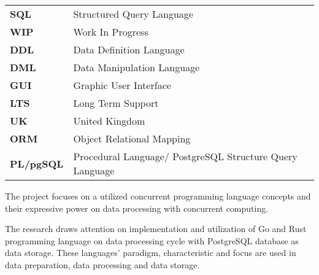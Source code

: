 \documentclass[12pt, oneside]{Thesis}
\begin{document}
\begin{table}[ht]
\begin{tabular}{p{2.5cm}p{11.0cm}}
		\textbf{SQL} & Structured Query Language\\
		\textbf{WIP} & Work In Progress\\
		\textbf{DDL} & Data Definition Language\\
		\textbf{DML} & Data Manipulation Language\\
		\textbf{GUI} & Graphic User Interface\\
		\textbf{LTS} & Long Term Support\\
		\textbf{UK} & United Kingdom\\
		\textbf{ORM} & Object Relational Mapping\\
		\textbf{PL/pgSQL} & Procedural Language/ PostgreSQL Structure Query Language\\
		
		
		
	\end{tabular}
\end{table}

\tableofcontents %

\listoftables %
%
\listoffigures %


\lstlistoflistings

\pagebreak
{} 

The project focuses on a utilized concurrent programming language concepts and their expressive power on data processing with concurrent computing.

The research draws attention on implementation and utilization of Go and Rust programming language on data processing cycle with PostgreSQL database as data storage. These languages’ paradigm, characteristic and focus are used in data preparation, data processing and data storage. 
\end{document}
